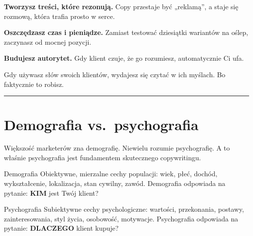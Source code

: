 \documentclass[
  12pt,
  a4paper,
  twoside,
  openright,
  12pt,
  DIV=12,
  BCOR=12mm]{scrbook}
\newcommand{\decoline}{%
  \begin{center}
    \textcolor{bordergray}{\rule{0.3\textwidth}{0.5pt}}
  \end{center}
}
\begin{document}
\textbf{Tworzysz treści, które rezonują.} Copy przestaje być „reklamą'',
a staje się rozmową, która trafia prosto w serce.

\textbf{Oszczędzasz czas i pieniądze.} Zamiast testować dziesiątki
wariantów na oślep, zaczynasz od mocnej pozycji.

\textbf{Budujesz autorytet.} Gdy klient czuje, że go rozumiesz,
automatycznie Ci ufa.

\begin{cytat}
Gdy używasz słów swoich klientów, wydajesz się czytać w ich myślach. Bo faktycznie to robisz.
\end{cytat}

\decoline

\section{Demografia vs.~psychografia}\label{demografia-vs.-psychografia}

Większość marketerów zna demografię. Niewielu rozumie psychografię. A to
właśnie psychografia jest fundamentem skutecznego copywritingu.

\begin{pojecie}{Demografia}
Obiektywne, mierzalne cechy populacji: wiek, płeć, dochód, wykształcenie, lokalizacja, stan cywilny, zawód. Demografia odpowiada na pytanie: \textbf{KIM} jest Twój klient?
\end{pojecie}

\begin{pojecie}{Psychografia}
Subiektywne cechy psychologiczne: wartości, przekonania, postawy, zainteresowania, styl życia, osobowość, motywacje. Psychografia odpowiada na pytanie: \textbf{DLACZEGO} klient kupuje?
\end{pojecie}
\end{document}
